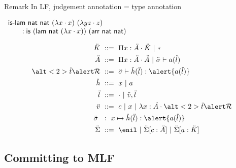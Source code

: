 \documentclass[ignorenonframetext,red]{beamer}
\begin{document}
\begin{frame}{}
  \begin{block}{Remark}
    In LF, judgement annotation = type annotation

    \begin{example}
      $
      \begin{array}{l}
        \text{\textsf{is-lam}}\ \mathsf{nat}\ \mathsf{nat}\ (\lambda{x}\cdot
        x)\ (\lambda{y z}\cdot z) \\ \qquad : \mathsf{is}\ (\mathsf{lam}\
        \mathsf{nat}\ (\lambda{x}\cdot x))\ (\mathsf{arr}\ \mathsf{nat}\
        \mathsf{nat})
      \end{array}
      $
    \end{example}
  \end{block}
  \pause
  \inXLF
  \begin{align*}
    \mk &\gequal \prd\mv\mf\mk \gor \type \\
    \mf &\gequal \prd\mv\mf\mf \gor \ms\vdash\lapp\mcf\ma \\
    \alt<2>\mo{\alert\mr} &\gequal \ms\vdash\laapp\mh\ma{\alert{\lapp\mcf\ma}} \\
    \mh &\gequal \mv \gor \mcf \\
    \ma &\gequal \lnil \gor \lcons\mval\ma \\
    \mval &\gequal \mco \gor \mv \gor \lam\mv\mf{\alt<2>\mo{\alert\mr}} \\
    \ms\ &\ :\ \mv\mapsto{\laapp\mh\ma{\alert{\lapp\mcf\ma}}} \\
    \msi &\gequal { \enil \gor \ebinddecl\msi\mco\mf \gor
      \ebinddecl\msi\mcf\mk }
  \end{align*}
  \pause
\end{frame}

\subsection{Committing to MLF}
\end{document}
